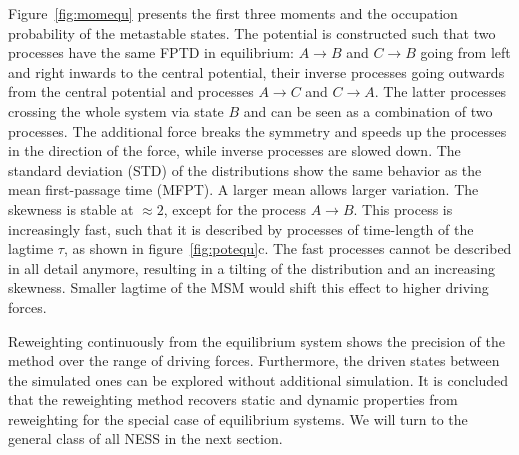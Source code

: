 Figure~\ref{fig:momequ} presents the first three moments and the occupation probability of the metastable states. The potential is constructed such that two processes have the same FPTD in equilibrium: $A \rightarrow B$ and $C \rightarrow B$ going from left and right inwards to the central potential, their inverse processes going outwards from the central potential and processes $A \rightarrow C$ and $C \rightarrow A$. The latter processes  crossing the whole system via state $B$ and can be seen as a combination of two processes. The additional force breaks the symmetry and speeds up the processes in the direction of the force, while inverse processes are slowed down. The standard deviation (STD) of the distributions show the same behavior as the mean first-passage time (MFPT). A larger mean allows larger variation. The skewness is  stable at $\approx 2 $, except for the process $A \rightarrow B$. This process is increasingly fast, such that it is described by processes of time-length of the lagtime $\tau$, as shown in figure~\ref{fig:potequ}c. The fast processes cannot be described in all detail anymore, resulting in a tilting of the distribution and an increasing skewness. Smaller lagtime of the MSM would shift this effect to higher driving forces.  

Reweighting continuously from the equilibrium system shows the precision of the method over the range of driving forces. Furthermore, the driven states between the simulated ones can be explored without additional simulation. It is concluded that the reweighting method recovers static and dynamic properties from reweighting for the special case of equilibrium systems. We will turn to the general class of all NESS in the next section.



\FloatBarrier

